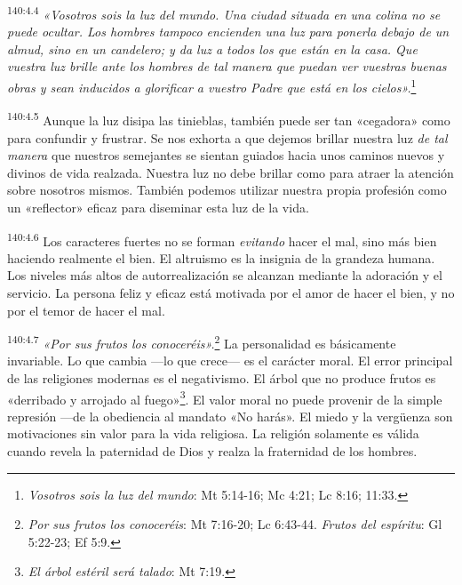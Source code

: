 \par
\textsuperscript{140:4.4} \textit{«Vosotros sois la luz del mundo. Una ciudad situada en una colina no se puede ocultar. Los hombres tampoco encienden una luz para ponerla debajo de un almud, sino en un candelero; y da luz a todos los que están en la casa. Que vuestra luz brille ante los hombres de tal manera que puedan ver vuestras buenas obras y sean inducidos a glorificar a vuestro Padre que está en los cielos».}\footnote{\textit{Vosotros sois la luz del mundo}: Mt 5:14-16; Mc 4:21; Lc 8:16; 11:33.}

\par
\textsuperscript{140:4.5} Aunque la luz disipa las tinieblas, también puede ser tan «cegadora» como para confundir y frustrar. Se nos exhorta a que dejemos brillar nuestra luz \textit{de tal manera} que nuestros semejantes se sientan guiados hacia unos caminos nuevos y divinos de vida realzada. Nuestra luz no debe brillar como para atraer la atención sobre nosotros mismos. También podemos utilizar nuestra propia profesión como un «reflector» eficaz para diseminar esta luz de la vida.

\par
\textsuperscript{140:4.6} Los caracteres fuertes no se forman \textit{evitando} hacer el mal, sino más bien haciendo realmente el bien. El altruismo es la insignia de la grandeza humana. Los niveles más altos de autorrealización se alcanzan mediante la adoración y el servicio. La persona feliz y eficaz está motivada por el amor de hacer el bien, y no por el temor de hacer el mal.

\par
\textsuperscript{140:4.7} \textit{«Por sus frutos los conoceréis».}\footnote{\textit{Por sus frutos los conoceréis}: Mt 7:16-20; Lc 6:43-44. \textit{Frutos del espíritu}: Gl 5:22-23; Ef 5:9.} La personalidad es básicamente invariable. Lo que cambia ---lo que crece--- es el carácter moral. El error principal de las religiones modernas es el negativismo. El árbol que no produce frutos es «derribado y arrojado al fuego»\footnote{\textit{El árbol estéril será talado}: Mt 7:19.}. El valor moral no puede provenir de la simple represión ---de la obediencia al mandato «No harás». El miedo y la verg\"uenza son motivaciones sin valor para la vida religiosa. La religión solamente es válida cuando revela la paternidad de Dios y realza la fraternidad de los hombres.

